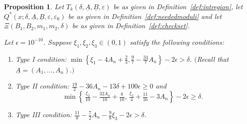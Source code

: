 \documentclass{amsart}
\newtheorem{prop}{Proposition}
\numberwithin{equation}{section}
\begin{document}
\begin{prop}\label{prop:tupleconditions}
Let  $T_k(\delta,\underline{A},\underline{B},\varepsilon)$ be as given in Definition~\ref{def:intregion},  let $Q^*(x;\delta,\underline{A},\underline{B},\varepsilon,\varepsilon_0)$ be as given in Definition~\ref{def:neededmoduli} and  let $\Xi(B_1,B_2,m_1,m_2,\delta)$ be as given in Definition~\ref{def:checkset}.  \smallskip

Let $\epsilon = 10^{-10}$. Suppose $\xi_1, \xi_2, \xi_3 \in (0,1)$ satisfy the following conditions: 
\begin{enumerate}[{\rm (I)}]
\item Type I condition: $\min\left\{  \xi_1 - 4 A_n + \tfrac{2}{3}   , \tfrac{9}{7}-\tfrac{34}{7} A_n  \right\}-2\epsilon  > \delta$. $($Recall that $\underline{A} =( A_1, \dots, A_n).)$
\item Type II condition: $
\tfrac{19}{2}-36 A_n   - 13\delta   +100\epsilon  \geq 0 $ and 
$$\min\left\{  \, \tfrac{\xi_2}{10} -\tfrac{32A_n}{10} + \tfrac{8}{10}  , \,
\tfrac{\xi_2}{4} +\tfrac{11}{16} -3A_n  \right\} -2\epsilon \geq \delta.$$
\item Type III condition:  $ \frac{11}{8}-\frac{7}{2}
 A_n -\frac{9}{8}\xi_3   -2\epsilon > \delta$.
\end{enumerate}


\end{prop}
\end{document}
